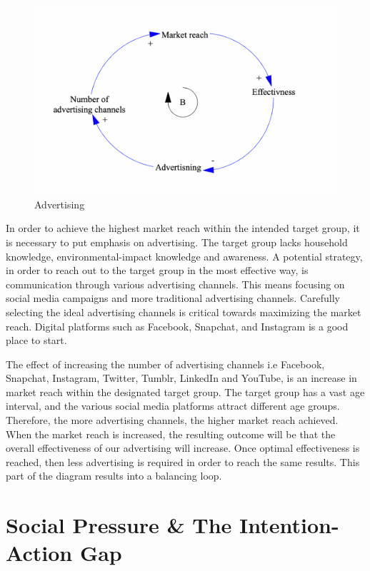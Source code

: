\begin{figure}[H]
\centering
\includegraphics [scale=0.20,angle=360]{figures/advertising.png}
\caption{Advertising}
\label{fig:advertising}
\end{figure}

\indent \newline
In order to achieve the highest market reach within the intended target group, it is necessary to put emphasis on advertising. The target group lacks household knowledge, environmental-impact knowledge and awareness. A potential strategy, in order to reach out to the target group in the most effective way, is communication through various advertising channels. This means focusing on social media campaigns and more traditional advertising channels. Carefully selecting the ideal advertising channels is critical towards maximizing the market reach. Digital platforms such as Facebook, Snapchat, and Instagram is a good place to start. 

\indent \newline
The effect of increasing the number of advertising channels i.e Facebook, Snapchat, Instagram, Twitter, Tumblr, LinkedIn and YouTube, is an increase in market reach within the designated target group. The target group has a vast age interval, and the various social media platforms attract different age groups. Therefore, the more advertising channels, the higher market reach achieved. When the market reach is increased, the resulting outcome will be that the overall effectiveness of our advertising will increase. Once optimal effectiveness is reached, then less advertising is required in order to reach the same results. This part of the diagram results into a balancing loop. 

\section{Social Pressure \& The Intention-Action Gap}

